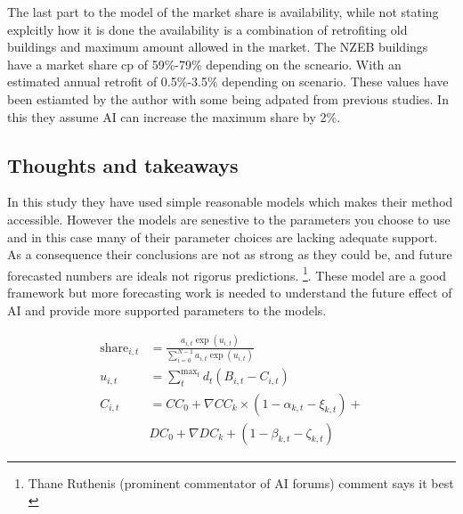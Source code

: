 \documentclass[conference,a4paper]{IEEEtran}
\begin{document}
The last part to the model of the market share is availability, while not stating explcitly how it is done the availability is a combination of retrofiting old buildings and maximum amount allowed in the market. The NZEB buildings have a market share cp of 59\%-79\% depending on the scneario. With an estimated annual retrofit of 0.5\%-3.5\% depending on scenario. These values have been estiamted by the author with some being adpated from previous studies. In this they assume AI can increase the maximum share by 2\%.

\subsection*{Thoughts and takeaways}
In this study they have used simple reasonable models which makes their method accessible. However the models are senestive to the parameters you choose to use and in this case many of their parameter choices are lacking adequate support. As a consequence their conclusions are not as strong as they could be, and future forecasted numbers are ideals not rigorus predictions. \footnote{Thane Ruthenis (prominent commentator of AI forums) comment says it best \cite{ruthenisDeepCritiqueAI2025}}. These model are a good framework but more forecasting work is needed to understand the future effect of AI and provide more supported parameters to the models.


\begin{align}
  \text{share}_{i,t} &= \frac{a_{i,t}\exp{(u_{i,t})}}{\sum_{i=0}^{N-1}a_{i,t}\exp{(u_{i,t})}}\label{eq:share} \\
  u_{i,t} &= \sum_{t}^{\text{max}_t}d_t(B_{i,t}-C_{i,t}) \label{eq:utility}\\
  C_{i,t} &= CC_0+ \nabla CC_k\times(1-\alpha_{k,t}-\xi_{k,t}) +\nonumber\\& DC_0+\nabla DC_k+(1-\beta_{k,t}-\zeta_{k,t}) \label{eq:cost}
\end{align}




\appendix
\end{document}

